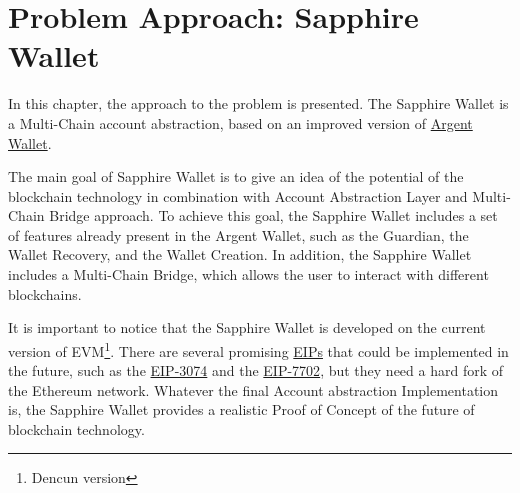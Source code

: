 \chapter{Problem Approach: Sapphire Wallet}
\label{chap:problem_approach}

In this chapter, the approach to the problem is presented. The Sapphire Wallet is a Multi-Chain account abstraction, based on an improved version of \hyperref[subsec:argent]{Argent Wallet}.

The main goal of Sapphire Wallet is to give an idea of the potential of the blockchain technology in combination with Account Abstraction Layer and Multi-Chain Bridge approach. To achieve this goal, the Sapphire Wallet includes a set of features already present in the Argent Wallet, such as the Guardian, the Wallet Recovery, and the Wallet Creation. In addition, the Sapphire Wallet includes a Multi-Chain Bridge, which allows the user to interact with different blockchains. 

It is important to notice that the Sapphire Wallet is developed on the current version of EVM\footnote{Dencun version}. There are several promising \hyperref[subsec:eips]{EIPs} that could be implemented in the future, such as the \hyperref[subsubsec:eip-3074]{EIP-3074} and the \hyperref[subsubsec:erc-7702]{EIP-7702}, but they need a hard fork of the Ethereum network. Whatever the final Account abstraction Implementation is, the Sapphire Wallet provides a realistic Proof of Concept of the future of blockchain technology.  








